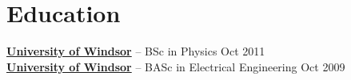 \documentclass[11pt]{article}       %
\begin{document}

\vspace{-18.5pt}

\section*{Education}
\textbf{\href{https://www.uwindsor.ca/}{University of Windsor}} -- BSc in Physics \hfill Oct 2011 \\
\textbf{\href{https://www.uwindsor.ca/}{University of Windsor}} -- BASc in Electrical Engineering \hfill Oct 2009
\end{document}
